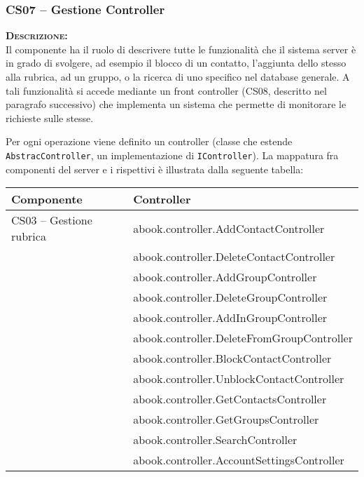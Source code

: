 
\subsubsection{CS07 -- Gestione Controller}\label{sec:cs07}
\begin{description}
	\item{\scshape\bfseries Descrizione:}\\
Il componente ha il ruolo di descrivere tutte le funzionalità che il sistema server è in grado di svolgere, ad esempio il blocco di un contatto, l'aggiunta dello stesso alla rubrica, ad un gruppo, o la ricerca di uno specifico nel database generale. A tali funzionalità si accede mediante un front controller (CS08, descritto nel paragrafo successivo) che implementa un sistema che permette di monitorare le richieste sulle stesse.

Per ogni operazione viene definito un controller (classe che estende \texttt{AbstracController}, un implementazione di \texttt{IController}). La mappatura fra componenti del server e i rispettivi  è illustrata dalla seguente tabella:

\begin{center}
\begin{tabular}{>{\sffamily}l>{\ttfamily}p{}}
\toprule
\textbf{\rmfamily Componente} & \textbf{\rmfamily Controller}\\
\midrule
CS03 -- Gestione rubrica 


& abook.controller.AddContactController\\
& abook.controller.DeleteContactController\\
& abook.controller.AddGroupController\\
& abook.controller.DeleteGroupController\\
& abook.controller.AddInGroupController\\
& abook.controller.DeleteFromGroupController\\
& abook.controller.BlockContactController\\
& abook.controller.UnblockContactController\\
& abook.controller.GetContactsController\\
& abook.controller.GetGroupsController\\
& abook.controller.SearchController\\
& abook.controller.AccountSettingsController\\



\end{tabular}
\end{center}
\end{description}
